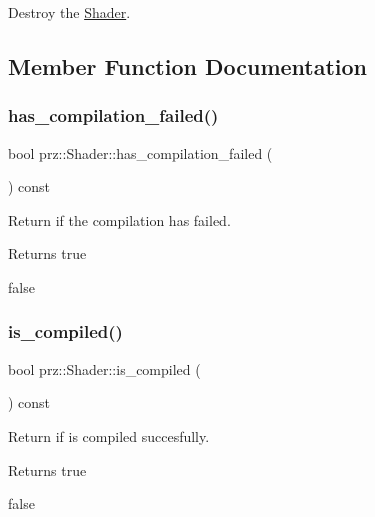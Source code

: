 Destroy the \mbox{\hyperlink{classprz_1_1_shader}{Shader}}. 



\subsection{Member Function Documentation}
\mbox{\label{classprz_1_1_shader_aee6376f3446bf9f163ea76d6a3a7491d}} 
\subsubsection{\texorpdfstring{has\_compilation\_failed()}{has\_compilation\_failed()}}
{\footnotesize\ttfamily bool prz\+::\+Shader\+::has\+\_\+compilation\+\_\+failed (\begin{DoxyParamCaption}{ }\end{DoxyParamCaption}) const\hspace{0.3cm}{\ttfamily [inline]}}



Return if the compilation has failed. 

\begin{DoxyReturn}{Returns}
true 

false 
\end{DoxyReturn}
\mbox{\label{classprz_1_1_shader_aaf76d1f8e733e2b2a92790283f396fb6}} 
\subsubsection{\texorpdfstring{is\_compiled()}{is\_compiled()}}
{\footnotesize\ttfamily bool prz\+::\+Shader\+::is\+\_\+compiled (\begin{DoxyParamCaption}{ }\end{DoxyParamCaption}) const\hspace{0.3cm}{\ttfamily [inline]}}



Return if is compiled succesfully. 

\begin{DoxyReturn}{Returns}
true 

false 
\end{DoxyReturn}
\mbox{\label{classprz_1_1_shader_af51b4c8c6aeced5c43ab485cb484f91e}} 
